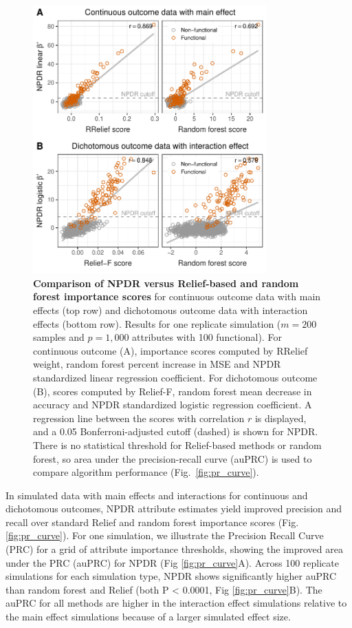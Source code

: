 \documentclass[10pt]{article}
\begin{document}
\begin{figure}[!tbp]
\centerline{\includegraphics[trim = 0 0 0 0, width=0.8\textwidth]{../figs/fig1.pdf}}
\caption{{\bf Comparison of NPDR versus Relief-based and random forest importance scores} for continuous outcome data with main effects (top row) and dichotomous outcome data with interaction effects (bottom row). Results for one replicate simulation ($m = 200$ samples and $p = 1,000$ attributes with 100 functional). For continuous outcome (A), importance scores computed by RRelief weight, random forest percent increase in MSE and NPDR standardized linear regression coefficient. For dichotomous outcome (B), scores computed by Relief-F, random forest mean decrease in accuracy and NPDR standardized logistic regression coefficient. A regression line between the scores with correlation $r$ is displayed, and a 0.05 Bonferroni-adjusted cutoff (dashed) is shown for NPDR. There is no statistical threshold for Relief-based methods or random forest, so area under the precision-recall curve (auPRC) is used to compare algorithm performance (Fig.~\ref{fig:pr_curve}).}
\label{fig:npdr_relief}
\end{figure}

In simulated data with main effects and interactions for continuous and dichotomous outcomes, NPDR attribute estimates yield improved precision and recall over standard Relief and random forest importance scores (Fig. \ref{fig:pr_curve}). For one simulation, we illustrate the Precision Recall Curve (PRC) for a grid of attribute importance thresholds, showing the improved area under the PRC (auPRC) for NPDR (Fig \ref{fig:pr_curve}A). Across 100 replicate simulations for each simulation type, NPDR shows significantly higher auPRC than random forest and Relief (both P < 0.0001, Fig \ref{fig:pr_curve}B). The auPRC for all methods are higher in the interaction effect simulations relative to the main effect simulations because of a larger simulated effect size. 
\end{document}
